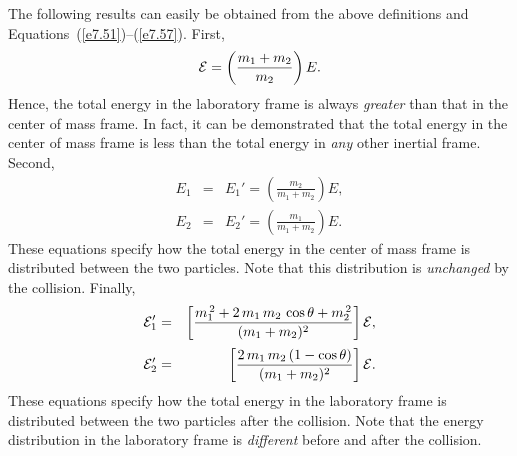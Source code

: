 The following results can easily be obtained from the above definitions and
Equations~(\ref{e7.51})--(\ref{e7.57}). First,
\begin{equation}\label{e7.58}
{\cal E} = \left(\frac{m_1+m_2}{m_2}\right)E.
\end{equation}
Hence, the total energy in the laboratory frame is always {\em greater}\/ than
that in the center of mass frame. In fact, it can be demonstrated that the
total energy in the center of mass frame is less than the total energy in {\em any}\/
other inertial frame. Second,
\begin{eqnarray}
E_1 &=& E_1'= \left(\frac{m_2}{m_1+m_2}\right) E,\label{e7.59}\\[0.5ex]
E_2 &=& E_2'=\left(\frac{m_1}{m_1+m_2}\right) E.\label{e7.60}
\end{eqnarray}
These equations specify how the total energy in the center of mass
frame is distributed
between the two particles. Note that this distribution is {\em unchanged}\/ by the
collision.
Finally,
\begin{eqnarray}
{\cal E}_1' &=& \left[\frac{m_1^{\,2}+2\,m_1\,m_2\,\cos\theta+m_2^{\,2}}{(m_1+m_2)^2}\right]{\cal E},\label{e7.61}\\[0.5ex]
{\cal E}_2'&=& \left[\frac{2\,m_1\,m_2\,(1-\cos\theta)}{(m_1+m_2)^2}\right] {\cal E}.\label{e7.62}
\end{eqnarray}
These equations specify how the total energy in the laboratory frame is distributed between
the two particles after the collision. Note that
the energy distribution in the laboratory frame is {\em different}\/ before and after the collision.

